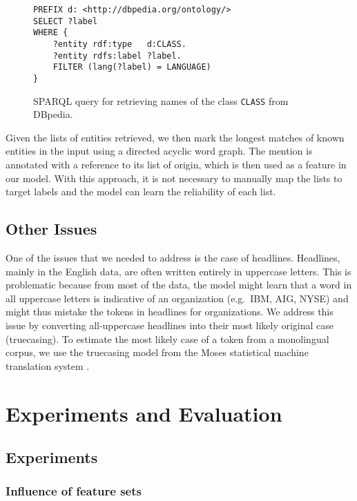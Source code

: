 \documentclass[11pt]{article}
\begin{document}
\begin{figure}
\begin{verbatim}
PREFIX d: <http://dbpedia.org/ontology/>
SELECT ?label
WHERE {
    ?entity rdf:type   d:CLASS.
    ?entity rdfs:label ?label.
    FILTER (lang(?label) = LANGUAGE)
}
\end{verbatim}
\caption{SPARQL query for retrieving names of the class \texttt{CLASS} from DBpedia.}
\label{fig:sparql}

\end{figure}

Given the lists of entities retrieved, we then mark the longest matches of known entities in the input using a directed acyclic word graph. 
The mention is annotated with a reference to its list of origin, which is then used as a feature in our model. With this approach, it is not 
necessary to manually map the lists to target labels and the model can learn the reliability of each list.


\subsection{Other Issues}

One of the issues that we needed to address is the case of headlines. Headlines, mainly in the English data, are often written entirely 
in uppercase letters. This is problematic because from most of the data, the model might learn that a word in all uppercase letters is 
indicative of an organization (e.g.\ IBM, AIG, NYSE) and might thus mistake the tokens in headlines for organizations. 
We address this issue by converting all-uppercase headlines into their most likely original case (truecasing). 
To estimate the most likely case of a token from a monolingual corpus, we use the truecasing model from the 
Moses statistical machine translation system \cite{koehn2007moses}. 


\section{Experiments and Evaluation}

\subsection{Experiments}

\subsubsection{Influence of feature sets}
\end{document}

